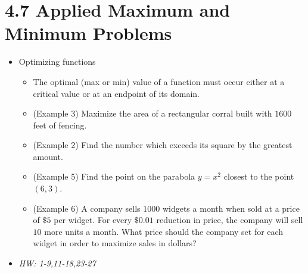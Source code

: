 \documentclass[11pt]{article}
\begin{document}
\section*{4.7 Applied Maximum and Minimum Problems}

\begin{itemize}
\item Optimizing functions
  \begin{itemize}
    \item The optimal (max or min) value of a function must occur either
          at a critical value or at an endpoint of its domain.
    \item (Example 3) Maximize the area of a rectangular corral built with
          \(1600\) feet of fencing.
    \item (Example 2) Find the number which exceeds its square by the greatest
          amount.
    \item (Example 5) Find the point on the parabola \(y=x^2\) closest to
          the point \((6,3)\).
    \item (Example 6) A company sells \(1000\) widgets a month when sold at
          a price of \(\$5\) per widget. For every \(\$0.01\) reduction in
          price, the company will sell \(10\) more units a month. What price
          should the company set for each widget in order to maximize sales
          in dollars?
  \end{itemize}
\item\textit{
  HW: 1-9,11-18,23-27
}
\end{itemize}
\end{document}
